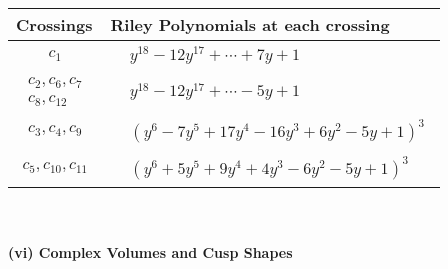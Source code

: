 \documentclass[1p]{elsarticle_modified}
\theoremstyle{definition}
\begin{document}
\begin{tabular}{m{50pt}|m{274pt}}
Crossings & \hspace{64pt}Riley Polynomials at each crossing \\
\hline $$\begin{aligned}c_{1}\end{aligned}$$&$\begin{aligned}
&y^{18}-12 y^{17}+\cdots+7 y+1
\end{aligned}$\\
\hline $$\begin{aligned}c_{2},c_{6},c_{7}\\c_{8},c_{12}\end{aligned}$$&$\begin{aligned}
&y^{18}-12 y^{17}+\cdots-5 y+1
\end{aligned}$\\
\hline $$\begin{aligned}c_{3},c_{4},c_{9}\end{aligned}$$&$\begin{aligned}
&(y^6-7 y^5+17 y^4-16 y^3+6 y^2-5 y+1)^3
\end{aligned}$\\
\hline $$\begin{aligned}c_{5},c_{10},c_{11}\end{aligned}$$&$\begin{aligned}
&(y^6+5 y^5+9 y^4+4 y^3-6 y^2-5 y+1)^3
\end{aligned}$\\
\hline
\end{tabular}\\~\\
\newpage\flushleft \textbf{(vi) Complex Volumes and Cusp Shapes}
\end{document}
